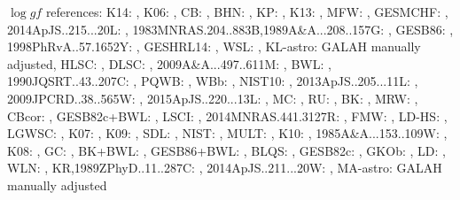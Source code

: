 \footnotesize{$\log gf$ references: K14: \citet{K14}, 
K06: \citet{K06}, 
CB: \citet{CB}, 
BHN: \citet{BHN}, 
KP: \citet{KP}, 
K13: \citet{K13}, 
MFW: \citet{MFW}, 
GESMCHF: \citet{GESMCHF}, 
2014ApJS..215...20L: \citet{2014ApJS..215...20L}, 
1983MNRAS.204..883B,1989A\&A...208..157G: \citet{1983MNRAS.204..883B,1989A&A...208..157G}, 
GESB86: \citet{GESB86}, 
1998PhRvA..57.1652Y: \citet{1998PhRvA..57.1652Y}, 
GESHRL14: \citet{GESHRL14}, 
WSL: \citet{WSL}, 
KL-astro: GALAH manually adjusted, 
HLSC: \citet{HLSC}, 
DLSC: \citet{DLSC}, 
2009A\&A...497..611M: \citet{2009A&A...497..611M}, 
BWL: \citet{BWL}, 
1990JQSRT..43..207C: \citet{1990JQSRT..43..207C}, 
PQWB: \citet{PQWB}, 
WBb: \citet{WBb}, 
NIST10: \citet{NIST10}, 
2013ApJS..205...11L: \citet{2013ApJS..205...11L}, 
2009JPCRD..38..565W: \citet{2009JPCRD..38..565W}, 
2015ApJS..220...13L: \citet{2015ApJS..220...13L}, 
MC: \citet{MC}, 
RU: \citet{RU}, 
BK: \citet{BK}, 
MRW: \citet{MRW}, 
CBcor: \citet{CBcor}, 
GESB82c+BWL: \citet{GESB82c,BWL}, 
LSCI: \citet{LSCI}, 
2014MNRAS.441.3127R: \citet{2014MNRAS.441.3127R}, 
FMW: \citet{FMW}, 
LD-HS: \citet{LD-HS}, 
LGWSC: \citet{LGWSC}, 
K07: \citet{K07}, 
K09: \citet{K09}, 
SDL: \citet{SDL}, 
NIST: \citet{NIST}, 
MULT: \citet{MULT}, 
K10: \citet{K10}, 
1985A\&A...153..109W: \citet{1985A&A...153..109W}, 
K08: \citet{K08}, 
GC: \citet{GC}, 
BK+BWL: \citet{BK,BWL}, 
GESB86+BWL: \citet{GESB86,BWL}, 
BLQS: \citet{BLQS}, 
GESB82c: \citet{GESB82c}, 
GKOb: \citet{GKOb}, 
LD: \citet{LD}, 
WLN: \citet{WLN}, 
KR,1989ZPhyD..11..287C: \citet{KR,1989ZPhyD..11..287C}, 
2014ApJS..211...20W: \citet{2014ApJS..211...20W}, 
MA-astro: GALAH manually adjusted}
